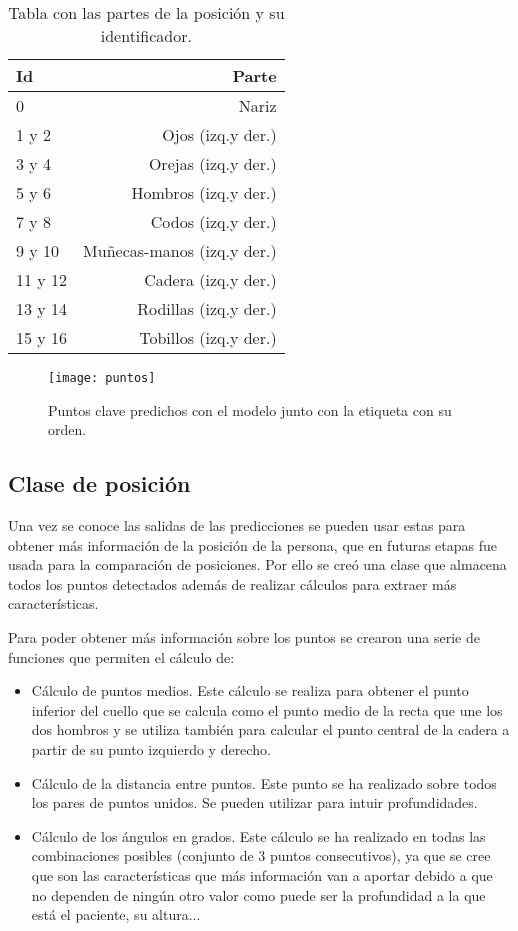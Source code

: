 {\begin{table}[h]
	\centering
	\begin{tabular}{lr}
		\toprule
		\textbf{Id} & \textbf{Parte}\\
		\midrule
		0&Nariz\\
		1 y 2&Ojos (izq.y der.)\\
		3 y 4&Orejas (izq.y der.)\\
		5 y 6&Hombros (izq.y der.)\\
		7 y 8&Codos (izq.y der.)\\
		9 y 10&Muñecas-manos (izq.y der.)\\
		11 y 12&Cadera (izq.y der.)\\
		13 y 14&Rodillas (izq.y der.)\\
		15 y 16&Tobillos (izq.y der.)\\
	\bottomrule
	\end{tabular}
\caption{Tabla con las partes de la posición y su identificador.}
\label{tab:partes}
\end{table}


\begin{figure}[h]
	\centering
	\texttt{[image: puntos]}
	\caption{Puntos clave predichos con el modelo junto con la etiqueta con su orden.}
	\label{fig:puntos}
\end{figure}
\subsection{Clase de posición}
Una vez se conoce las salidas de las predicciones se pueden usar estas para obtener más información de la posición de la persona, que en futuras etapas fue usada para la comparación de posiciones. Por ello se creó una clase que almacena todos los puntos detectados además de realizar cálculos para extraer más características.

Para poder obtener más información sobre los puntos se crearon una serie de funciones que permiten el cálculo de:
\begin{itemize}
	\item Cálculo de puntos medios. Este cálculo se realiza para obtener el punto inferior del cuello que se calcula como el punto medio de la recta que une los dos hombros y se utiliza también para calcular el punto central de la cadera a partir de su punto izquierdo y derecho.
	\item Cálculo de la distancia entre puntos. Este punto se ha realizado sobre todos los pares de puntos unidos. Se pueden utilizar para intuir profundidades.
	\item Cálculo de los ángulos en grados. Este cálculo se ha realizado en todas las combinaciones posibles (conjunto de 3 puntos consecutivos), ya que se cree que son las características que más información van a aportar debido a que no dependen de ningún otro valor como puede ser la profundidad a la que está el paciente, su altura...
\end{itemize}

}
